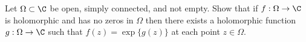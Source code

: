 Let $\Omega\subset \C$ be open, simply connected, and not empty. Show
that if $f:\Omega\rightarrow \C$ is holomorphic and has no zeros in
$\Omega$ then there exists a holomorphic function $g:\Omega\rightarrow
\C$ such that $f(z)=\exp\{g(z)\}$ at each point $z\in \Omega$. 

